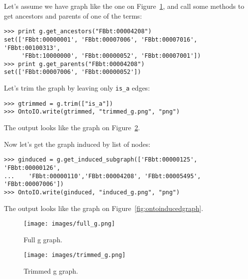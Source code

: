 Let's assume we have graph like the one on Figure~\ref{fig:ontofullgraph}, and
call some methods to get ancestors and parents of one of the terms:

\begin{verbatim}
>>> print g.get_ancestors("FBbt:00004208")
set(['FBbt:00000001', 'FBbt:00007006', 'FBbt:00007016', 'FBbt:00100313',
     'FBbt:10000000', 'FBbt:00000052', 'FBbt:00007001'])
>>> print g.get_parents("FBbt:00004208")
set(['FBbt:00007006', 'FBbt:00000052'])
\end{verbatim}

Let's trim the graph by leaving only \verb|is_a| edges:
\begin{verbatim}
>>> gtrimmed = g.trim(["is_a"])
>>> OntoIO.write(gtrimmed, "trimmed_g.png", "png")
\end{verbatim}

The output looks like the graph on Figure~\ref{fig:ontotrimmedgraph}.

Now let's get the graph induced by list of nodes:
\begin{verbatim}
>>> ginduced = g.get_induced_subgraph(['FBbt:00000125', 'FBbt:00000126',
...    'FBbt:00000110','FBbt:00004208', 'FBbt:00005495', 'FBbt:00007006'])
>>> OntoIO.write(ginduced, "induced_g.png", "png")
\end{verbatim}

The output looks like the graph on Figure~\ref{fig:ontoinducedgraph}.


\begin{htmlonly}
\label{fig:ontofullgraph}
\end{htmlonly}

\begin{latexonly}
\begin{figure}[htbp]
\centering
\texttt{[image: images/full\_g.png]}
\caption{Full g graph.}
\label{fig:ontofullgraph}
\end{figure}
\end{latexonly}

\begin{htmlonly}
\label{fig:ontotrimmedgraph}
\end{htmlonly}

\begin{latexonly}
\begin{figure}[htbp]
\centering
\texttt{[image: images/trimmed\_g.png]}
\caption{Trimmed g graph.}
\label{fig:ontotrimmedgraph}
\end{figure}
\end{latexonly}

